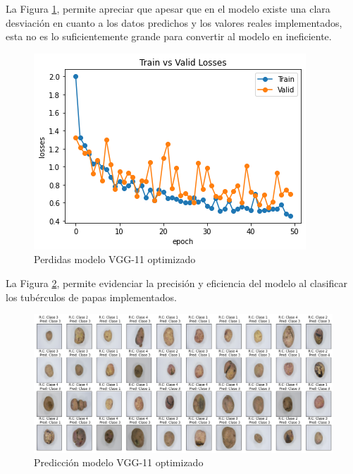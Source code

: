 	La Figura \ref{fig:perdda_vgg11_opt}, permite apreciar que apesar que en el modelo existe una clara desviación en cuanto a los datos predichos y los valores reales implementados, esta no es lo suficientemente grande para convertir al modelo en ineficiente.
		\begin{figure}[ht]
			\centering
			\includegraphics[scale=0.6]{Figs/509.png}
			\caption{Perdidas modelo VGG-11 optimizado}
			\label{fig:perdda_vgg11_opt}
		\end{figure}
	
	
	La Figura \ref{fig:pre_vgg11_opt}, permite evidenciar la precisión y eficiencia del modelo al clasificar los tubérculos de papas implementados. 	
		\begin{figure}[ht]
			\centering
			\includegraphics[scale=0.4]{Figs/510.png}
			\caption{Predicción modelo VGG-11 optimizado}
			\label{fig:pre_vgg11_opt}
		\end{figure}
	
